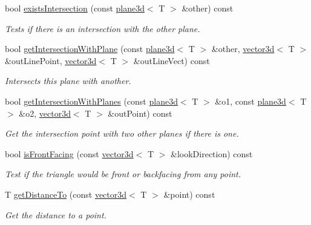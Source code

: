\begin{DoxyCompactItemize}
bool \hyperlink{classirr_1_1core_1_1plane3d_a62f0838578d34260a5ef664718be59b4}{exists\+Intersection} (const \hyperlink{classirr_1_1core_1_1plane3d}{plane3d}$<$ T $>$ \&other) const
\begin{DoxyCompactList}\small\item\em Tests if there is an intersection with the other plane. \end{DoxyCompactList}\item 
bool \hyperlink{classirr_1_1core_1_1plane3d_aa50063460dbcda6bc2b61ec4e9a15f0c}{get\+Intersection\+With\+Plane} (const \hyperlink{classirr_1_1core_1_1plane3d}{plane3d}$<$ T $>$ \&other, \hyperlink{classirr_1_1core_1_1vector3d}{vector3d}$<$ T $>$ \&out\+Line\+Point, \hyperlink{classirr_1_1core_1_1vector3d}{vector3d}$<$ T $>$ \&out\+Line\+Vect) const
\begin{DoxyCompactList}\small\item\em Intersects this plane with another. \end{DoxyCompactList}\item 
\mbox{\label{classirr_1_1core_1_1plane3d_aa211e140706ba340cc413e1dfc095efd}} 
bool \hyperlink{classirr_1_1core_1_1plane3d_aa211e140706ba340cc413e1dfc095efd}{get\+Intersection\+With\+Planes} (const \hyperlink{classirr_1_1core_1_1plane3d}{plane3d}$<$ T $>$ \&o1, const \hyperlink{classirr_1_1core_1_1plane3d}{plane3d}$<$ T $>$ \&o2, \hyperlink{classirr_1_1core_1_1vector3d}{vector3d}$<$ T $>$ \&out\+Point) const
\begin{DoxyCompactList}\small\item\em Get the intersection point with two other planes if there is one. \end{DoxyCompactList}\item 
bool \hyperlink{classirr_1_1core_1_1plane3d_aca0237b25cbf4fe13d87b14a04d68df9}{is\+Front\+Facing} (const \hyperlink{classirr_1_1core_1_1vector3d}{vector3d}$<$ T $>$ \&look\+Direction) const
\begin{DoxyCompactList}\small\item\em Test if the triangle would be front or backfacing from any point. \end{DoxyCompactList}\item 
T \hyperlink{classirr_1_1core_1_1plane3d_ab5e41d5843bf3bb856f543186b8a7df8}{get\+Distance\+To} (const \hyperlink{classirr_1_1core_1_1vector3d}{vector3d}$<$ T $>$ \&point) const
\begin{DoxyCompactList}\small\item\em Get the distance to a point. \end{DoxyCompactList}\end{DoxyCompactItemize}

